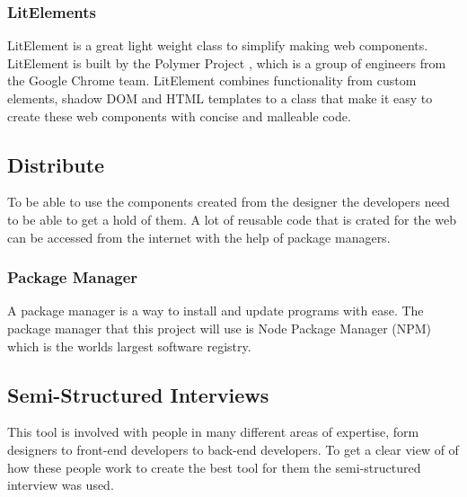 \subsubsection{LitElements}%
\label{ssub:LitElements}
LitElement is a great light weight class to simplify making web components\cite{polymerLitElement}. LitElement is built by the Polymer Project \cite{polymerPolymerProject}, which is a group of engineers from the Google Chrome team. LitElement combines functionality from custom elements, shadow DOM and HTML templates to a class that make it easy to create these web components with concise and malleable code.




\subsection{Distribute}%
\label{sub:Distribute}
To be able to use the components created from the designer the developers need to be able to get a hold of them. A lot of reusable code that is crated for the web can be accessed from the internet with the help of package managers.

\subsubsection{Package Manager}%
\label{sub:Package Manager}
\cite{PackageManager2020} 

A package manager is a way to install and update programs with ease. The package manager that this project will use is Node Package Manager (NPM) which is the worlds largest software registry\cite{NpmNpmDocs}.


\subsection{Semi-Structured Interviews}%
\label{sub:inteviews}
This tool is involved with people in many different areas of expertise, form designers to front-end developers to back-end developers. To get a clear view of of how these people work to create the best tool for them the semi-structured interview was used. 

